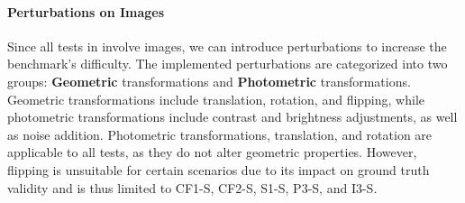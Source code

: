 \paragraph{Perturbations on Images}

Since all tests in {\methodname} involve images, we can introduce perturbations to increase the benchmark's difficulty.
The implemented perturbations are categorized into two groups: \textbf{Geometric} transformations and \textbf{Photometric} transformations.
Geometric transformations include translation, rotation, and flipping, while photometric transformations include contrast and brightness adjustments, as well as noise addition.
Photometric transformations, translation, and rotation are applicable to all tests, as they do not alter geometric properties.
However, flipping is unsuitable for certain scenarios due to its impact on ground truth validity and is thus limited to CF1-S, CF2-S, S1-S, P3-S, and I3-S.